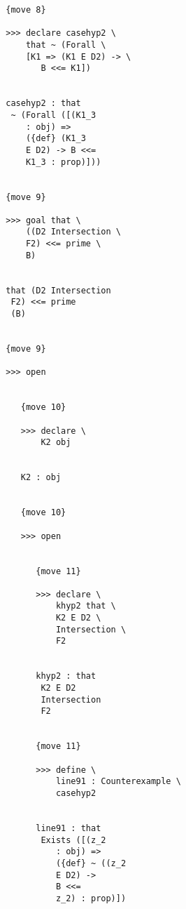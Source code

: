 \documentclass[12pt]{article}
\begin{document}
\begin{verbatim}
                           {move 8}

                           >>> declare casehyp2 \
                               that ~ (Forall \
                               [K1 => (K1 E D2) -> \
                                  B <<= K1])


                           casehyp2 : that 
                            ~ (Forall ([(K1_3 
                               : obj) => 
                               ({def} (K1_3 
                               E D2) -> B <<= 
                               K1_3 : prop)]))


                           {move 9}

                           >>> goal that \
                               ((D2 Intersection \
                               F2) <<= prime \
                               B)


                           that (D2 Intersection 
                            F2) <<= prime 
                            (B)


                           {move 9}

                           >>> open


                              {move 10}

                              >>> declare \
                                  K2 obj


                              K2 : obj


                              {move 10}

                              >>> open


                                 {move 11}

                                 >>> declare \
                                     khyp2 that \
                                     K2 E D2 \
                                     Intersection \
                                     F2


                                 khyp2 : that 
                                  K2 E D2 
                                  Intersection 
                                  F2


                                 {move 11}

                                 >>> define \
                                     line91 : Counterexample \
                                     casehyp2


                                 line91 : that 
                                  Exists ([(z_2 
                                     : obj) => 
                                     ({def} ~ ((z_2 
                                     E D2) -> 
                                     B <<= 
                                     z_2) : prop)])



\end{verbatim}
\end{document}
